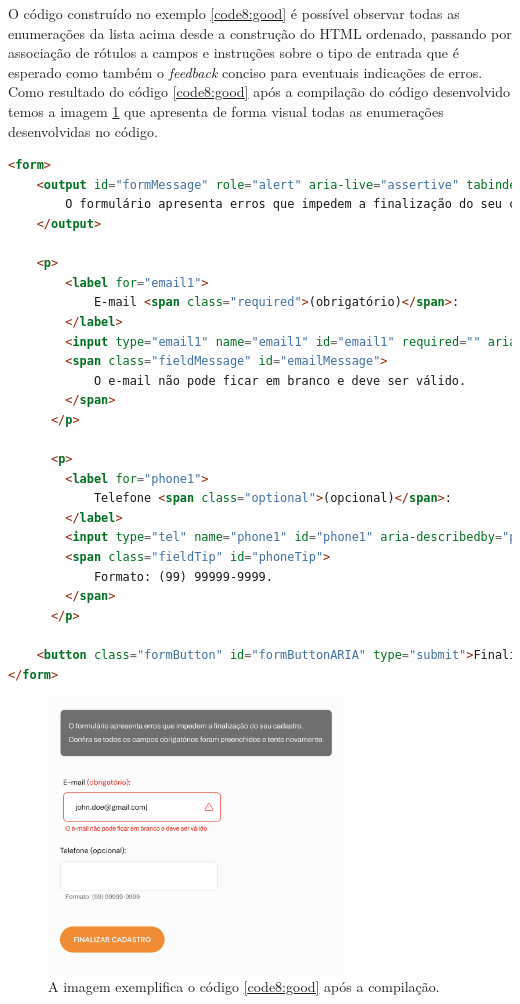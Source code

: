 {\begin{enumerate}
   
\end{enumerate}

 O código construído no exemplo \ref{code8:good} é possível observar todas as enumerações da lista acima desde a construção do HTML \cite{HTML} ordenado, passando por associação de rótulos a campos e instruções sobre o tipo de entrada que é esperado como também o \textit{feedback} conciso para eventuais indicações de erros. Como resultado do código \ref{code8:good} após a compilação do código desenvolvido temos a imagem \ref{fig5:code8} que apresenta de forma visual todas as enumerações desenvolvidas no código.
    
{\begin{lstlisting}[language=html, caption={Formulário acessível usando abordagens citadas acima}, label=code8:good]
<form>
    <output id="formMessage" role="alert" aria-live="assertive" tabindex="0" class="error">
        O formulário apresenta erros que impedem a finalização do seu cadastro. Confira se todos os campos obrigatórios foram preenchidos e tente novamente.
    </output>

    <p>
        <label for="email1">
            E-mail <span class="required">(obrigatório)</span>:
        </label>
        <input type="email1" name="email1" id="email1" required="" aria-invalid="true" aria-describedby="emailMessage">
        <span class="fieldMessage" id="emailMessage">
            O e-mail não pode ficar em branco e deve ser válido.
        </span>
      </p>

      <p>
        <label for="phone1">
            Telefone <span class="optional">(opcional)</span>:
        </label>
        <input type="tel" name="phone1" id="phone1" aria-describedby="phoneTip">
        <span class="fieldTip" id="phoneTip">
            Formato: (99) 99999-9999.
        </span>
      </p>

    <button class="formButton" id="formButtonARIA" type="submit">Finalizar cadastro</button>
</form>
\end{lstlisting}}

\begin{figure}[ht]
  	\center
    \includegraphics[width=0.7\textwidth]{images/form-acessivel.png}
    \caption{A imagem exemplifica o código \ref{code8:good} após a compilação.}
    \label{fig5:code8}
\end{figure} 
}
